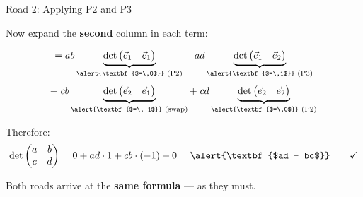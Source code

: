 \documentclass[10pt]{beamer}
\theoremstyle{definition}
\newcommand{\x}[1]{\alert{\textbf{#1}}}
\begin{document}
\begin{frame}{Road 2: Applying P2 and P3}

Now expand the \x{second} column in each term:

$$
= ab\underbrace{\det\begin{pmatrix} \vec{e}_1 & \vec{e}_1 \end{pmatrix}}_{\x{$=\,0$}\text{ (P2)}}
+\; ad\underbrace{\det\begin{pmatrix} \vec{e}_1 & \vec{e}_2 \end{pmatrix}}_{\x{$=\,1$}\text{ (P3)}}
$$
$$
+\; cb\underbrace{\det\begin{pmatrix} \vec{e}_2 & \vec{e}_1 \end{pmatrix}}_{\x{$=\,-1$}\text{ (swap)}}
+\; cd\underbrace{\det\begin{pmatrix} \vec{e}_2 & \vec{e}_2 \end{pmatrix}}_{\x{$=\,0$}\text{ (P2)}}
$$

\vfill
Therefore:
$$
\det\begin{pmatrix} a & b \\ c & d \end{pmatrix}
= 0 + ad\cdot 1 + cb\cdot(-1) + 0 = \x{$ad - bc$} \qquad \checkmark
$$

\vfill
Both roads arrive at the \x{same formula} — as they must.

\end{frame}
\end{document}
